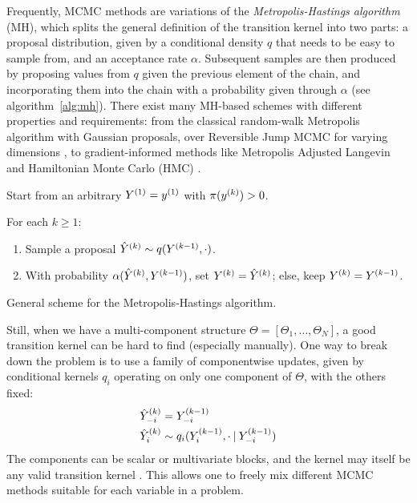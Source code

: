 Frequently, MCMC methods are variations of the \emph{Metropolis-Hastings algorithm} (MH), which
splits the general definition of the transition kernel into two parts: a proposal distribution,
given by a conditional density \(q\) that needs to be easy to sample from, and an acceptance rate
\(\alpha\).  Subsequent samples are then produced by proposing values from \(q\) given the previous
element of the chain, and incorporating them into the chain with a probability given through
\(\alpha\) (see algorithm~\ref{alg:mh}). There exist many MH-based
schemes with different properties and requirements: from the classical random-walk Metropolis
algorithm with Gaussian proposals, over Reversible Jump MCMC for varying dimensions
\parencite{green1995reversible}, to gradient-informed methods like Metropolis Adjusted Langevin and
Hamiltonian Monte Carlo (HMC) \parencite{betancourt2018conceptual,girolami2011riemann}.

\begin{algorithm}[t]
  \begin{myalgorithmic}
  \item Start from an arbitrary \(\kth[1]{Y} = \kth[1]{y}\) with \(\pi(\kth{y}) > 0\).
  \item For each \(k \ge 1\):
    \begin{enumerate}
    \item Sample a proposal \(\kth[k]{\hat{Y}} \from q(\kth[k-1]{Y}, \cdot)\).
    \item With probability \(\alpha(\kth[k]{\hat{Y}}, \kth[k-1]{Y})\), set
      \(\kth[k]{Y} = \kth[k]{\hat{Y}}\); else, keep \(\kth[k]{Y} = \kth[k-1]{Y}\).
    \end{enumerate}
  \end{myalgorithmic}
  \caption{General scheme for the Metropolis-Hastings algorithm.\label{alg:mh}}
\end{algorithm}

Still, when we have a multi-component structure \(\Theta = [\Theta_1, \ldots, \Theta_N]\), a good
transition kernel can be hard to find (especially manually).  One way to break down the problem is
to use a family of componentwise updates, given by conditional kernels \(q_{i}\) operating on only
one component of \(\Theta\), with the others fixed:
\begin{equation}
  \label{eq:conditional-kernels}
  \begin{aligned}
    \kth[k]{\hat{Y}}_{-i} &= \kth[k-1]{Y}_{-i} \\
    \kth[k]{\hat{Y}}_{i} &\from q_{i}(\kth[k-1]{Y}_{i}, \cdot \given \kth[k-1]{Y}_{-i})
  \end{aligned}
\end{equation}
The components can be scalar or multivariate blocks, and the kernel may itself be any valid
transition kernel \parencite[chapter 6.6]{vihola2020lectures}.  This allows one to freely mix
different MCMC methods suitable for each variable in a problem.

